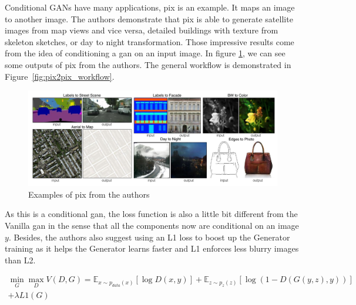 Conditional GANs have many applications, \acrfull{pix} \cite{pix2pix} is an example.
It maps an image to another image. The authors demonstrate that \acrshort{pix} is able to
generate satellite images from map views and vice versa, detailed buildings with texture
from skeleton sketches, or day to night transformation. Those impressive results come from
the idea of conditioning a \acrshort{gan} on an input image. In figure
\ref{fig:pix2pix_examples}, we can see some outputs of \acrshort{pix} from the authors.
The general workflow is demonstrated in Figure~\ref{fig:pix2pix_workflow}.

\begin{figure}[h]
	\centering
	\includegraphics[width=0.8\linewidth]{img/pix2pix_examples}
	\caption{Examples of \acrshort{pix} from the authors}
	\label{fig:pix2pix_examples}
\end{figure}

As this is a conditional \acrshort{gan}, the loss function is also a little bit different
from the Vanilla \acrshort{gan} in the sense that all the components now are conditional
on an image $y$.  Besides, the authors also suggest using an L1 loss to boost up the
Generator training as it helps the Generator learns faster and L1 enforces less blurry
images than L2.

\begin{align*}
	\min_{G} \max_{D} V(D, G) = \mathbb{E}_{x \sim p_{data}(x)} [\log D(x, y)] +
	\mathbb{E}_{z \sim p_z(z)}[\log(1 - D(G(y, z), y))] \\ 
	+ \lambda L1(G)
\end{align*}
